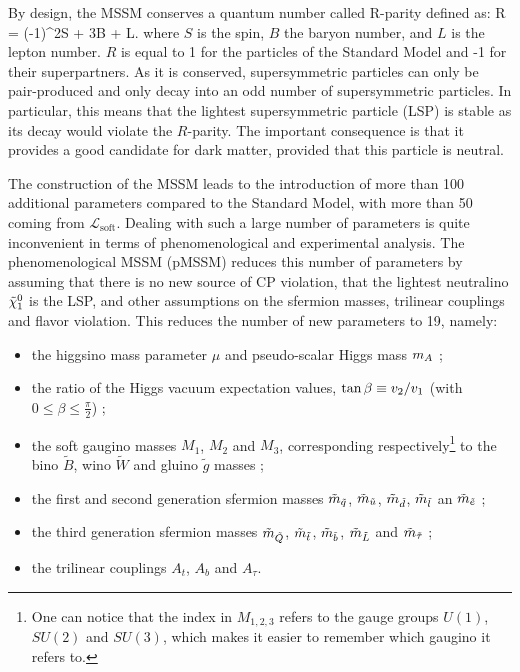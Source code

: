         By design, the MSSM conserves a quantum number called R-parity defined as:
        {
            R = (-1)^{2S + 3B + L}.
        }
        where $S$ is the spin, $B$ the baryon number, and $L$ is the lepton number. $R$ is
        equal to 1 for the particles of the Standard Model and -1 for their superpartners.
        As it is conserved, supersymmetric particles can only be
        pair-produced and only decay into an odd number of supersymmetric particles. In
        particular, this means that the lightest supersymmetric particle (LSP) is stable as
        its decay would violate the $R$-parity. The important consequence is that it provides
        a good candidate for dark matter, provided that this particle is neutral.

        The construction of the MSSM leads to the introduction of more than 100 additional
        parameters compared to the Standard Model, with more than 50 coming from $\mathcal{L}_\text{soft}$.
        Dealing with such a large number of
        parameters is quite inconvenient in terms of phenomenological and experimental analysis.
        The phenomenological MSSM (pMSSM) reduces this number of parameters by assuming that
        there is no new source of CP violation, that the lightest neutralino $\tilde{\chi}_1^0$
        is the LSP, and other assumptions on the sfermion masses, trilinear couplings and
        flavor violation. This reduces the number of new parameters to 19, namely:
        \begin{itemize}
            \item the higgsino mass parameter $\mu$ and pseudo-scalar Higgs mass $m_{A}$ ;
            \item the ratio of the Higgs vacuum expectation values, $\text{tan}\, \beta \equiv v_2 / v_1$ (with $0 \leq \beta \leq \frac{\pi}{2}$) ;
            \item the soft gaugino masses $M_1$, $M_2$ and $M_3$, corresponding respectively\footnote{One can notice that the index in $M_{1,2,3}$ refers to the gauge groups $U(1)$, $SU(2)$ and $SU(3)$, which makes it easier to remember which gaugino it refers to.} to the bino $\tilde{B}$, wino $\tilde{W}$ and gluino $\tilde{g}$ masses ;
            \item the first and second generation sfermion masses $\tilde{m}_{\tilde{q}}$, $\tilde{m}_{\tilde{u}}$, $\tilde{m}_{\tilde{d}}$, $\tilde{m}_{\tilde{l}}$ an $\tilde{m}_{\tilde{e}}$ ;
            \item the third generation sfermion masses $\tilde{m}_{\tilde{Q}}$, $\tilde{m}_{\tilde{t}}$, $\tilde{m}_{\tilde{b}}$, $\tilde{m}_{\tilde{L}}$ and $\tilde{m}_{\tilde{\tau}}$ ;
            \item the trilinear couplings $A_t$, $A_b$ and $A_\tau$.
        \end{itemize}
